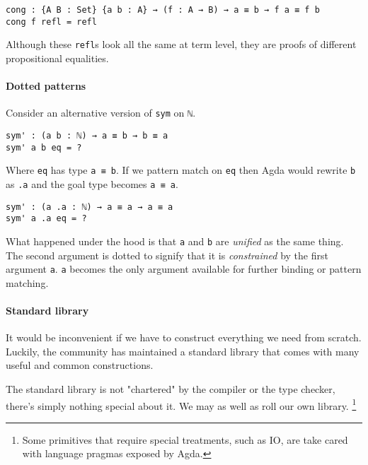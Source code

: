\documentclass[../thesis.tex]{subfiles}
\begin{document}
\begin{lstlisting}
cong : {A B : Set} {a b : A} → (f : A → B) → a ≡ b → f a ≡ f b
cong f refl = refl
\end{lstlisting}

Although these {\lstinline|refl|}s look all the same at term level, they
are proofs of different propositional equalities.

\paragraph{Dotted patterns}

Consider an alternative version of {\lstinline|sym|} on {\lstinline|ℕ|}.

\begin{lstlisting}
sym' : (a b : ℕ) → a ≡ b → b ≡ a
sym' a b eq = ?
\end{lstlisting}

Where {\lstinline|eq|} has type {\lstinline|a ≡ b|}.
If we pattern match on {\lstinline|eq|} then Agda would rewrite {\lstinline|b|}
as {\lstinline|.a|} and the goal type becomes {\lstinline|a ≡ a|}.
\begin{lstlisting}
sym' : (a .a : ℕ) → a ≡ a → a ≡ a
sym' a .a eq = ?
\end{lstlisting}

What happened under the hood is that {\lstinline|a|} and {\lstinline|b|} are
\textit{unified} as the same thing. The second argument is dotted to signify that
it is \textit{constrained} by the first argument {\lstinline|a|}. {\lstinline|a|}
becomes the only argument available for further binding or pattern matching.

\paragraph{Standard library}

It would be inconvenient if we have to construct everything we need from scratch.
Luckily, the community has maintained a standard library that comes with many useful
and common constructions.

The standard library is not "chartered" by the compiler or the type checker,
there's simply nothing special about it. We may as well as roll our own library.
\footnote{Some primitives that require special treatments, such as IO, are take cared with 
language pragmas exposed  by Agda.}
\end{document}
